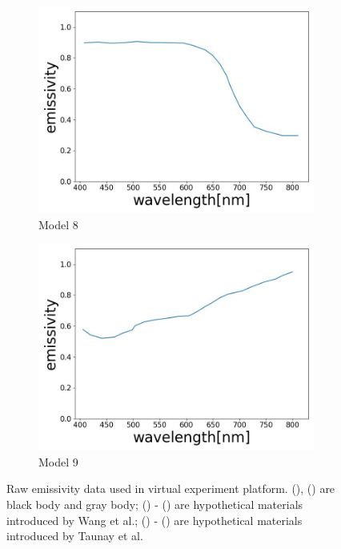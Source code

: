 \begin{figure}[htbp]
    \begin{subfigure}{0.3\linewidth}
      \centering
      \includegraphics[width=\linewidth]{figures/emissivity_32.jpg}
      \caption{Model 8}
      \label{fig: emi_32}
    \end{subfigure}
    \begin{subfigure}{0.3\linewidth}
      \centering
      \includegraphics[width=\linewidth]{figures/emissivity_33.jpg}
      \caption{Model 9}
      \label{fig: emi_33}
    \end{subfigure}
    
    \caption{Raw emissivity data used in virtual experiment platform. (), 
    () are black body and gray body; () - ()
    are hypothetical materials introduced by Wang et al.\cite{Wang.2021b}; () - 
    () are hypothetical materials introduced by Taunay et al.\cite{Taunay.2020b}}
    \label{fig: emi_model}
\end{figure}


